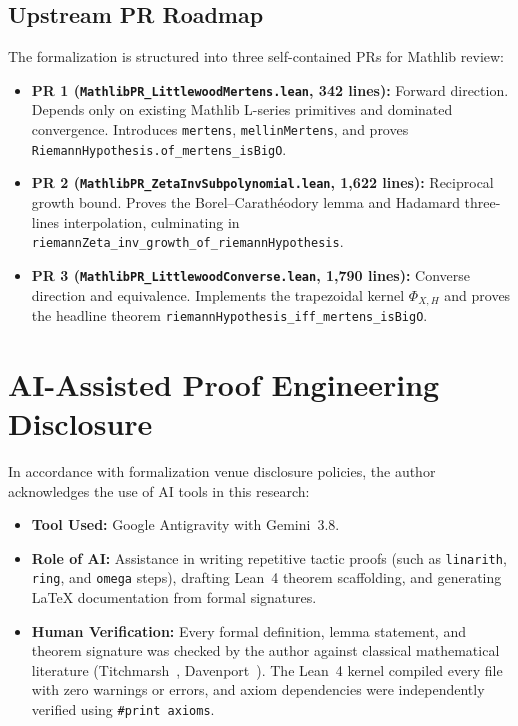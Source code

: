 \documentclass[11pt,a4paper]{article}
\theoremstyle{definition}
\begin{document}
\subsection{Upstream PR Roadmap}
The formalization is structured into three self-contained PRs for Mathlib review:
\begin{itemize}[leftmargin=1.5em]
  \item \textbf{PR 1 (\texttt{MathlibPR\_LittlewoodMertens.lean}, 342 lines):} Forward direction. Depends only on existing Mathlib L-series primitives and dominated convergence. Introduces \texttt{mertens}, \texttt{mellinMertens}, and proves \texttt{RiemannHypothesis.of\_mertens\_isBigO}.
  \item \textbf{PR 2 (\texttt{MathlibPR\_ZetaInvSubpolynomial.lean}, 1,622 lines):} Reciprocal growth bound. Proves the Borel--Carath\'eodory lemma and Hadamard three-lines interpolation, culminating in \texttt{riemannZeta\_inv\_growth\_of\_riemannHypothesis}.
  \item \textbf{PR 3 (\texttt{MathlibPR\_LittlewoodConverse.lean}, 1,790 lines):} Converse direction and equivalence. Implements the trapezoidal kernel $\Phi_{X,H}$ and proves the headline theorem \texttt{riemannHypothesis\_iff\_mertens\_isBigO}.
\end{itemize}

\section{AI-Assisted Proof Engineering Disclosure}
\label{sec:ai_disclosure}

In accordance with formalization venue disclosure policies, the author acknowledges the use of AI tools in this research:
\begin{itemize}[leftmargin=1.5em]
  \item \textbf{Tool Used:} Google Antigravity with Gemini~3.8.
  \item \textbf{Role of AI:} Assistance in writing repetitive tactic proofs (such as \texttt{linarith}, \texttt{ring}, and \texttt{omega} steps), drafting Lean~4 theorem scaffolding, and generating LaTeX documentation from formal signatures.
  \item \textbf{Human Verification:} Every formal definition, lemma statement, and theorem signature was checked by the author against classical mathematical literature (Titchmarsh~\cite{Titchmarsh1986}, Davenport~\cite{Davenport1980}). The Lean~4 kernel compiled every file with zero warnings or errors, and axiom dependencies were independently verified using \texttt{\#print axioms}.
\end{itemize}
\end{document}
